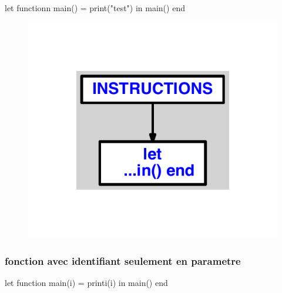 \documentclass{article}
\begin{document}
\begin{verbatimtab}
let
	functionn main() = print("test")
in main() end
\end{verbatimtab}
\begin{figure}[H]\centering\includegraphics[max width=\textwidth]{ast/ast_217.pdf}\end{figure}\subsubsection{fonction avec identifiant seulement en parametre}
\begin{verbatimtab}
let
	function main(i) = printi(i)
in main() end
\end{verbatimtab}
\end{document}
